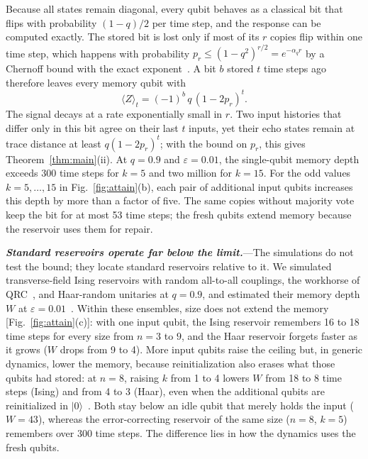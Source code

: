 \documentclass[aps,prl,twocolumn,superscriptaddress,floatfix]{revtex4-2}
\theoremstyle{plain}
\newcommand{\ket}[1]{|#1\rangle}
\newcommand{\runin}[1]{\textit{\textbf{#1}}---}
\begin{document}
Because all states remain diagonal, every qubit behaves as a classical bit that flips with probability $(1-q)/2$ per time step, and the response can be computed exactly. The stored bit is lost only if most of its $r$ copies flip within one time step, which happens with probability $p_r\le(1-q^2)^{r/2}=e^{-\alpha_qr}$ by a Chernoff bound with the exact exponent~\cite[Sec.~V]{SM}. A bit $b$ stored $t$ time steps ago therefore leaves every memory qubit with
\begin{equation}
\langle Z\rangle_t=(-1)^b\,q\,(1-2p_r)^t .
\label{eq:response}
\end{equation}
The signal decays at a rate exponentially small in $r$. Two input histories that differ only in this bit agree on their last $t$ inputs, yet their echo states remain at trace distance at least $q(1-2p_r)^t$; with the bound on $p_r$, this gives Theorem~\ref{thm:main}(ii). At $q=0.9$ and $\varepsilon=0.01$, the single-qubit memory depth exceeds 300 time steps for $k=5$ and two million for $k=15$. For the odd values $k=5,\ldots,15$ in Fig.~\ref{fig:attain}(b), each pair of additional input qubits increases this depth by more than a factor of five. The same copies without majority vote keep the bit for at most 53 time steps; the fresh qubits extend memory because the reservoir uses them for repair.

\runin{Standard reservoirs operate far below the limit.}The simulations do not test the bound; they locate standard reservoirs relative to it. We simulated transverse-field Ising reservoirs with random all-to-all couplings, the workhorse of QRC~\cite{Fujii2017,Nakajima2019,MartinezPena2021}, and Haar-random unitaries at $q=0.9$, and estimated their memory depth $W$ at $\varepsilon=0.01$~\cite{SM}. Within these ensembles, size does not extend the memory [Fig.~\ref{fig:attain}(c)]: with one input qubit, the Ising reservoir remembers 16 to 18 time steps for every size from $n=3$ to $9$, and the Haar reservoir forgets faster as it grows ($W$ drops from 9 to 4). More input qubits raise the ceiling but, in generic dynamics, lower the memory, because reinitialization also erases what those qubits had stored: at $n=8$, raising $k$ from 1 to 4 lowers $W$ from 18 to 8 time steps (Ising) and from 4 to 3 (Haar), even when the additional qubits are reinitialized in $\ket0$~\cite{SM}. Both stay below an idle qubit that merely holds the input ($W=43$), whereas the error-correcting reservoir of the same size ($n=8$, $k=5$) remembers over 300 time steps. The difference lies in how the dynamics uses the fresh qubits.
\end{document}
